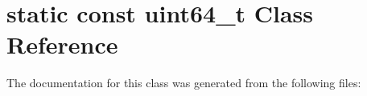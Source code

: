 \hypertarget{classstatic_01const_01uint64__t}{}\section{static const uint64\+\_\+t Class Reference}
\label{classstatic_01const_01uint64__t}


The documentation for this class was generated from the following files\+: